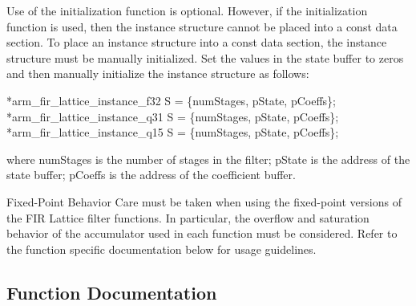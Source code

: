 \begin{DoxyParagraph}{}
Use of the initialization function is optional. However, if the initialization function is used, then the instance structure cannot be placed into a const data section. To place an instance structure into a const data section, the instance structure must be manually initialized. Set the values in the state buffer to zeros and then manually initialize the instance structure as follows\+: 
\begin{DoxyPre}
*arm\_fir\_lattice\_instance\_f32 S = \{numStages, pState, pCoeffs\};
*arm\_fir\_lattice\_instance\_q31 S = \{numStages, pState, pCoeffs\};
*arm\_fir\_lattice\_instance\_q15 S = \{numStages, pState, pCoeffs\};
  \end{DoxyPre}
 
\end{DoxyParagraph}
\begin{DoxyParagraph}{}
where {\ttfamily num\+Stages} is the number of stages in the filter; {\ttfamily p\+State} is the address of the state buffer; {\ttfamily p\+Coeffs} is the address of the coefficient buffer. 
\end{DoxyParagraph}
\begin{DoxyParagraph}{Fixed-\/\+Point Behavior}
Care must be taken when using the fixed-\/point versions of the F\+IR Lattice filter functions. In particular, the overflow and saturation behavior of the accumulator used in each function must be considered. Refer to the function specific documentation below for usage guidelines. 
\end{DoxyParagraph}


\subsection{Function Documentation}
